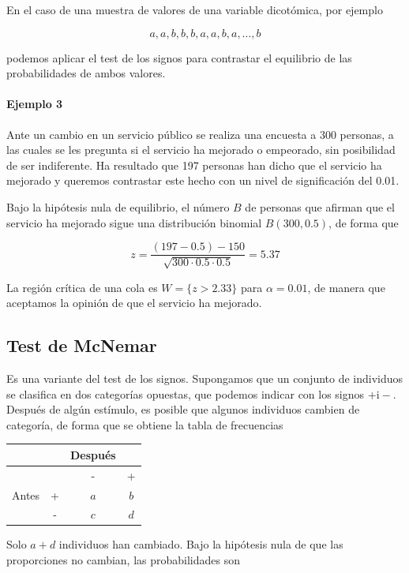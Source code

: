 \documentclass[
]{article}
\begin{document}
En el caso de una muestra de valores de una variable dicotómica, por ejemplo

\[
a, a, b, b, b, a, a, b, a, \ldots, b
\]

podemos aplicar el test de los signos para contrastar el equilibrio de las probabilidades de ambos valores.

\paragraph{Ejemplo 3}\label{ejemplo-3-1}

Ante un cambio en un servicio público se realiza una encuesta a 300 personas, a las cuales se les pregunta si el servicio ha mejorado o empeorado, sin posibilidad de ser indiferente. Ha resultado que 197 personas han dicho que el servicio ha mejorado y queremos contrastar este hecho con un nivel de significación del 0.01.

Bajo la hipótesis nula de equilibrio, el número \(B\) de personas que afirman que el servicio ha mejorado sigue una distribución binomial \(B(300,0.5)\), de forma que

\[
z=\frac{(197-0.5)-150}{\sqrt{300 \cdot 0.5 \cdot 0.5}}=5.37
\]

La región crítica de una cola es \(W=\{z>2.33\}\) para \(\alpha=0.01\), de manera que aceptamos la opinión de que el servicio ha mejorado.

\subsection{Test de McNemar}\label{test-de-mcnemar}

Es una variante del test de los signos. Supongamos que un conjunto de individuos se clasifica en dos categorías opuestas, que podemos indicar con los signos \(+\mathrm{i}-\).
Después de algún estímulo, es posible que algunos individuos cambien de categoría, de forma que se obtiene la tabla de frecuencias

\begin{longtable}[]{@{}cccc@{}}
\toprule\noalign{}
& & Después & \\
\midrule\noalign{}
\endhead
\bottomrule\noalign{}
\endlastfoot
& & - & + \\
Antes & + & \(a\) & \(b\) \\
& - & \(c\) & \(d\) \\
\end{longtable}

Solo \(a+d\) individuos han cambiado. Bajo la hipótesis nula de que las proporciones no cambian, las probabilidades son
\end{document}
